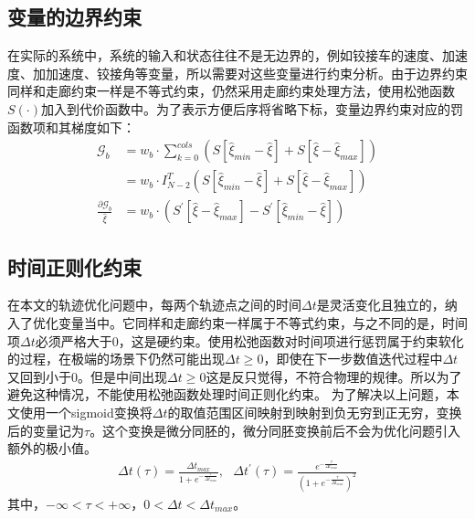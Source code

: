 \documentclass[master,academic]{ysuthesis} %
\begin{document}
		\subsection{变量的边界约束}
		在实际的系统中，系统的输入和状态往往不是无边界的，例如铰接车的速度、加速度、加加速度、铰接角等变量，所以需要对这些变量进行约束分析。由于边界约束同样和走廊约束一样是不等式约束，仍然采用走廊约束处理方法，使用松弛函数$S(\cdot)$加入到代价函数中。为了表示方便后序将省略下标，变量边界约束对应的罚函数项和其梯度如下：
		\begin{equation}
			\begin{aligned}
				\mathcal{G}_b&=w_b\cdot \sum_{k=0}^{cols}{\left( S\left[ \hat{\xi}_{min}-\hat{\xi} \right] +S\left[ \hat{\xi}-\hat{\xi}_{max} \right] \right)}\\
				&=w_b\cdot I_{N-2}^{T}\left( S\left[ \hat{\xi}_{min}-\hat{\xi} \right] +S\left[ \hat{\xi}-\hat{\xi}_{max} \right] \right)\\
				\frac{\partial \mathcal{G}_b}{\hat{\xi}}&=w_b\cdot \left( S^{'}\left[ \hat{\xi}-\hat{\xi}_{max} \right] -S^{'}\left[ \hat{\xi}_{min}-\hat{\xi} \right] \right)
			\end{aligned}
			\label{eq:Gb}
		\end{equation}

		\subsection{时间正则化约束}
		在本文的轨迹优化问题中，每两个轨迹点之间的时间$\Delta t$是灵活变化且独立的，纳入了优化变量当中。它同样和走廊约束一样属于不等式约束，与之不同的是，时间项$\Delta t$必须严格大于0，这是硬约束。使用松弛函数对时间项进行惩罚属于约束软化的过程，在极端的场景下仍然可能出现$\Delta t \ge 0$，即使在下一步数值迭代过程中$\Delta t$又回到小于0。但是中间出现$\Delta t \ge 0$这是反只觉得，不符合物理的规律。所以为了避免这种情况，不能使用松弛函数处理时间正则化约束。
		为了解决以上问题，本文使用一个sigmoid变换将$\Delta t$的取值范围区间映射到映射到负无穷到正无穷，变换后的变量记为$\tau$。这个变换是微分同胚的，微分同胚变换前后不会为优化问题引入额外的极小值。
		\begin{equation}
			\begin{aligned}
				\Delta t\left( \tau \right) =\frac{\Delta t_{max}}{1+e^{-\frac{\tau}{\Delta t_{max}}}},\,\,\,\,\Delta t^{'}\left( \tau \right) =\frac{e^{-\frac{\tau}{\Delta t_{max}}}}{\left( 1+e^{-\frac{\tau}{\Delta t_{max}}} \right) ^2}
			\end{aligned}
		\end{equation}
		其中，$-\infty <\tau <+\infty $，$0<\Delta t<\Delta t_{max}$。
		
\end{document}
